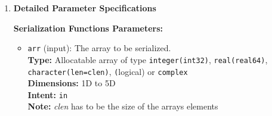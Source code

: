 \begin{enumerate}
\begin{enumerate}
\begin{itemize}
                    \item \texttt{deserialize\_char\_Nd(arr, filename, ierr)} -
                          Deserialize N-dimensional character arrays.
                          
                    \item \texttt{serialize\_logical\_Nd(arr, filename, ierr)} -
                          Serialize N-dimensional logical arrays.
                          
                    \item \texttt{deserialize\_logical\_Nd(arr, filename, ierr)} -
                          Deserialize N-dimensional logical arrays.
                          
                    \item \texttt{serialize\_complex\_Nd(arr, filename, ierr)} -
                          Serialize N-dimensional complex arrays.
                          
                    \item \texttt{deserialize\_complex\_Nd(arr, filename, ierr)} -
                          Deserialize N-dimensional complex arrays.
                          
                    \item \texttt{get\_array\_metadata(filename, dims, max\_dims, ndims,
                          ierr, [clen])} - Retrieve array metadata from files
                  \end{itemize}
                  
                  Where N represents the array dimension (1-5).
                  
            \item \textbf{Detailed Parameter Specifications}
                  
                  \textbf{Serialization Functions Parameters:}
                  \begin{itemize}
                    \item \texttt{arr} (input): The array to be serialized. \\ \textbf{Type:}
                          Allocatable array of type \texttt{integer(int32)}, \texttt{real(real64)},
                          \texttt{character(len=clen)}, \texttt{(}logical) or \texttt{complex}
                          \\ \textbf{Dimensions:} 1D to 5D \\ \textbf{Intent:} \texttt{in}
                          \\ \textbf{Note:} \textit{clen} has to be the size of the arrays
                          elements
                          

\end{itemize}
\end{enumerate}
\end{enumerate}
